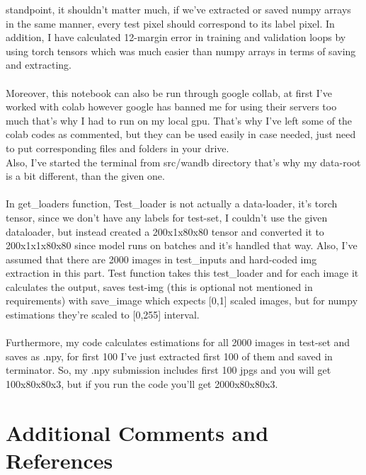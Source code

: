 \documentclass[12pt]{article}
\begin{document}
\begin{center}
standpoint, it shouldn't matter much, if we've extracted or saved numpy arrays in the same manner, every test pixel should correspond
to its label pixel. In addition, I have calculated 12-margin error in training and validation loops
by using torch tensors which was much easier than numpy arrays in terms of saving and extracting.
\\~\\
Moreover, this notebook can also be run through google collab, at first I've worked with colab however google has banned me
for using their servers too much that's why I had to run on my local gpu. That's
why I've left some of the colab codes as commented, but they can be used easily in case needed, just need to put corresponding files and folders in your drive.
\\
Also, I've started the terminal from src/wandb directory that's why my data-root is a bit different, than the given one.
\\~\\
In get\_loaders function,
Test\_loader is not actually a data-loader, it's torch tensor, since we don't have any labels for test-set,
I couldn't use the given dataloader, but instead created a 200x1x80x80 tensor and
converted it to 200x1x1x80x80 since model runs on batches and it's handled that way.
Also, I've assumed that there are 2000 images in test\_inputs and hard-coded img extraction in this part.
Test function takes this test\_loader and for each image it calculates the output, saves test-img (this is optional not mentioned in requirements) with save\_image which expects [0,1] scaled images,
but for numpy estimations they're scaled to [0,255] interval.
\\~\\
Furthermore, my code calculates estimations for all 2000 images in test-set and saves as .npy, for first 100 I've just extracted first 100 of them and saved in terminator.
So, my .npy submission includes first 100 jpgs and you will get 100x80x80x3, but if you run the code you'll get 2000x80x80x3.

\end{center}

\section{Additional Comments and References}
\end{document}
